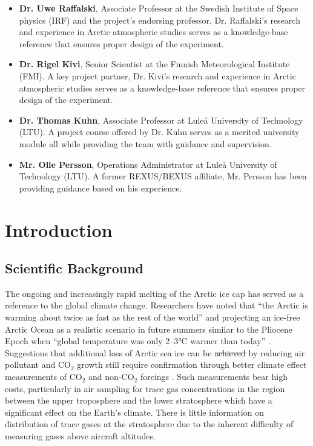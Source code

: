 \documentclass[a4paper,12pt,twoside]{article}
\providecommand{\DIFaddtex}[1]{{\protect\color{blue}\uwave{#1}}} %
\providecommand{\DIFdeltex}[1]{{\protect\color{red}\sout{#1}}}                      %
\providecommand{\DIFaddbegin}{} %
\providecommand{\DIFaddend}{} %
\providecommand{\DIFdelbegin}{} %
\providecommand{\DIFdelend}{} %
\providecommand{\DIFadd}[1]{\texorpdfstring{\DIFaddtex{#1}}{#1}} %
\providecommand{\DIFdel}[1]{\texorpdfstring{\DIFdeltex{#1}}{}} %
\newcommand{\DIFscaledelfig}{0.5}
\newlength{\DIFdelgraphicswidth} %
\newlength{\DIFdelgraphicsheight} %
\newcommand{\DIFaddincludegraphics}[2][]{{\color{blue}\fbox{\DIFOincludegraphics[#1]{#2}}}} %
\newcommand{\DIFdelincludegraphics}[2][]{%
\sbox{\DIFdelgraphicsbox}{\DIFOincludegraphics[#1]{#2}}%
\settoboxwidth{\DIFdelgraphicswidth}{\DIFdelgraphicsbox} %
\settoboxtotalheight{\DIFdelgraphicsheight}{\DIFdelgraphicsbox} %
\scalebox{\DIFscaledelfig}{%
\parbox[b]{\DIFdelgraphicswidth}{\usebox{\DIFdelgraphicsbox}\\[-\baselineskip] \rule{\DIFdelgraphicswidth}{0em}}\llap{\resizebox{\DIFdelgraphicswidth}{\DIFdelgraphicsheight}{%
\setlength{\unitlength}{\DIFdelgraphicswidth}%
\begin{picture}(1,1)%
\thicklines\linethickness{2pt} %
{\color[rgb]{1,0,0}\put(0,0){\framebox(1,1){}}}%
{\color[rgb]{1,0,0}\put(0,0){\line( 1,1){1}}}%
{\color[rgb]{1,0,0}\put(0,1){\line(1,-1){1}}}%
\end{picture}%
}\hspace*{3pt}}} %
} %
\DeclareRobustCommand{\DIFaddbegin}{\DIFOaddbegin \let\includegraphics\DIFaddincludegraphics} %
\DeclareRobustCommand{\DIFaddend}{\DIFOaddend \let\includegraphics\DIFOincludegraphics} %
\DeclareRobustCommand{\DIFdelbegin}{\DIFOdelbegin \let\includegraphics\DIFdelincludegraphics} %
\DeclareRobustCommand{\DIFdelend}{\DIFOaddend \let\includegraphics\DIFOincludegraphics} %
\begin{document}
\begin{itemize}
  \item \textbf{Dr. Uwe Raffalski}, Associate Professor at the Swedish Institute of Space physics (IRF) and the project's endorsing professor. Dr. Raffalski's research and experience in Arctic atmospheric studies serves as a knowledge-base reference that ensures proper design of the experiment.
  \item \textbf{Dr. Rigel Kivi}, Senior Scientist at the Finnish Meteorological Institute (FMI). A key project partner, Dr. Kivi's research and experience in Arctic atmospheric studies serves as a knowledge-base reference that ensures proper design of the experiment.  
  \item \textbf{Dr. Thomas Kuhn}, Associate Professor at Luleå  University of Technology (LTU). A project course offered by Dr. Kuhn serves as a merited university module all while providing the team with guidance and supervision. 
  \item \textbf{Mr. Olle Persson}, Operations Administrator at Luleå University of Technology (LTU). A former REXUS/BEXUS affiliate, Mr. Persson has been providing guidance based on his experience.
\end{itemize}


\pagestyle{SED}
\raggedbottom  %

%

\section{Introduction}
\subsection{Scientific Background}

The ongoing and increasingly rapid melting of the Arctic ice cap has served as a reference to the global climate change. Researchers have noted that \enquote{the Arctic is warming about twice as fast as the rest of the world} \cite{Perkins} and projecting an ice-free Arctic Ocean as a realistic scenario in future summers similar to the Pliocene Epoch when \enquote{global temperature was only 2–3°C warmer than today} \cite{Trace}. Suggestions that additional loss of Arctic sea ice can be \DIFdelbegin \DIFdel{achieved }\DIFdelend \DIFaddbegin \DIFadd{avoided }\DIFaddend by reducing air pollutant and CO$_{2}$ growth still require confirmation through better climate effect measurements of CO$_{2}$ and non-CO$_{2}$ forcings \cite{Trace}. Such measurements bear high costs, particularly in air sampling for trace gas concentrations in the region between the upper troposphere and the lower stratosphere which have a significant effect on the Earth's climate. There is little information on distribution of trace gases at the stratosphere due to the inherent difficulty of measuring gases above aircraft altitudes.
\end{document}
